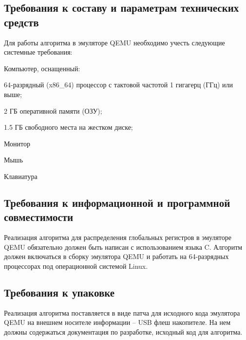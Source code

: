 \subsection{Требования к составу и параметрам технических средств}
Для работы алгоритма в эмуляторе QEMU необходимо учесть следующие системные требования:
\begin{my_enumerate}
\item Компьютер, оснащенный:
    \begin{my_enumerate}
    \item 64-разрядный (x86\_64) процессор с тактовой частотой 1 гигагерц (ГГц) или выше;
    \item 2 ГБ оперативной памяти (ОЗУ);
    \item 1.5 ГБ свободного места на жестком диске;
    \end{my_enumerate}
\item Монитор
\item Мышь
\item Клавиатура
\end{my_enumerate}


\subsection{Требования к информационной и программной совместимости}

Реализация алгоритма для распределения глобальных регистров в эмуляторе QEMU обязательно должен быть написан с использованием языка C. Алгоритм должен включаться в сборку эмулятора QEMU и работать на 64-разрядных процессорах под операционной системой Linux.


\subsection{Требования к упаковке}
Реализация алгоритма поставляется в виде патча для исходного кода эмулятора QEMU на внешнем носителе информации – USB флеш накопителе. На нем должны содержаться документация по разработке, исходный код для алгоритма.
